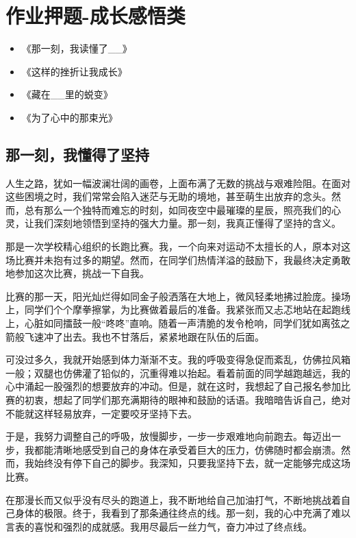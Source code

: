\chapter{作业押题-成长感悟类}

\begin{itemize}
    \item 《那一刻，我读懂了\_\_》
    \item 《这样的挫折让我成长》
    \item 《藏在\_\_里的蜕变》
    \item 《为了心中的那束光》
\end{itemize}


\section{那一刻，我懂得了坚持}

人生之路，犹如一幅波澜壮阔的画卷，上面布满了无数的挑战与艰难险阻。在面对这些困境之时，我们常常会陷入迷茫与无助的境地，甚至萌生出放弃的念头。然而，总有那么一个独特而难忘的时刻，如同夜空中最璀璨的星辰，照亮我们的心灵，让我们深刻地领悟到坚持的强大力量。那一刻，我真正懂得了坚持的含义。

那是一次学校精心组织的长跑比赛。我，一个向来对运动不太擅长的人，原本对这场比赛并未抱有过多的期望。然而，在同学们热情洋溢的鼓励下，我最终决定勇敢地参加这次比赛，挑战一下自我。

比赛的那一天，阳光灿烂得如同金子般洒落在大地上，微风轻柔地拂过脸庞。操场上，同学们个个摩拳擦掌，为比赛做着最后的准备。我紧张而又忐忑地站在起跑线上，心脏如同擂鼓一般“咚咚”直响。随着一声清脆的发令枪响，同学们犹如离弦之箭般飞速冲了出去。我也不甘落后，紧紧地跟在队伍的后面。

可没过多久，我就开始感到体力渐渐不支。我的呼吸变得急促而紊乱，仿佛拉风箱一般；双腿也仿佛灌了铅似的，沉重得难以抬起。看着前面的同学越跑越远，我的心中涌起一股强烈的想要放弃的冲动。但是，就在这时，我想起了自己报名参加比赛的初衷，想起了同学们那充满期待的眼神和鼓励的话语。我暗暗告诉自己，绝对不能就这样轻易放弃，一定要咬牙坚持下去。

于是，我努力调整自己的呼吸，放慢脚步，一步一步艰难地向前跑去。每迈出一步，我都能清晰地感受到自己的身体在承受着巨大的压力，仿佛随时都会崩溃。然而，我始终没有停下自己的脚步。我深知，只要我坚持下去，就一定能够完成这场比赛。

在那漫长而又似乎没有尽头的跑道上，我不断地给自己加油打气，不断地挑战着自己身体的极限。终于，我看到了那条通往终点的线。那一刻，我的心中充满了难以言表的喜悦和强烈的成就感。我用尽最后一丝力气，奋力冲过了终点线。

